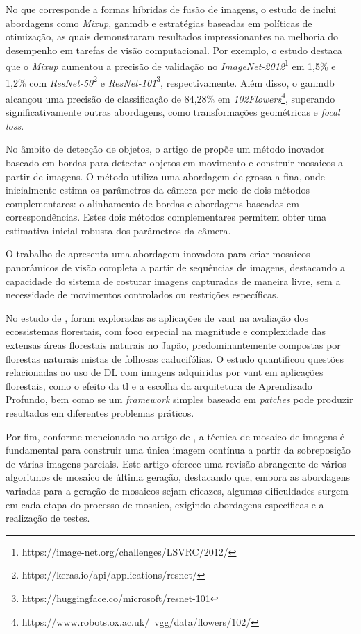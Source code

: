 No que corresponde a formas híbridas de fusão de imagens, o estudo de  inclui abordagens como \textit{Mixup}, \gls{ganmdb} e estratégias baseadas em políticas de otimização, as quais demonstraram resultados impressionantes na melhoria do desempenho em tarefas de visão computacional. Por exemplo, o estudo destaca que o \textit{Mixup} aumentou a precisão de validação no \textit{ImageNet-2012}\footnote{https://image-net.org/challenges/LSVRC/2012/} em 1,5\% e 1,2\% com \textit{ResNet-50}\footnote{https://keras.io/api/applications/resnet/} e \textit{ResNet-101}\footnote{https://huggingface.co/microsoft/resnet-101}, respectivamente. Além disso, o \gls{ganmdb} alcançou uma precisão de classificação de 84,28\% em \textit{102Flowers}\footnote{https://www.robots.ox.ac.uk/~vgg/data/flowers/102/}, superando significativamente outras abordagens, como transformações geométricas e \textit{focal loss}.

No âmbito de detecção de objetos, o artigo de  propõe um método inovador baseado em bordas para detectar objetos em movimento e construir mosaicos a partir de imagens. O método utiliza uma abordagem de grossa a fina, onde inicialmente estima os parâmetros da câmera por meio de dois métodos complementares: o alinhamento de bordas e abordagens baseadas em correspondências. Estes dois métodos complementares permitem obter uma estimativa inicial robusta dos parâmetros da câmera.

O trabalho de  apresenta uma abordagem inovadora para criar mosaicos panorâmicos de visão completa a partir de sequências de imagens, destacando a capacidade do sistema de costurar imagens capturadas de maneira livre, sem a necessidade de movimentos controlados ou restrições específicas.

No estudo de , foram exploradas as aplicações de \gls{vant} na avaliação dos ecossistemas florestais, com foco especial na magnitude e complexidade das extensas áreas florestais naturais no Japão, predominantemente compostas por florestas naturais mistas de folhosas caducifólias. O estudo quantificou questões relacionadas ao uso de DL com imagens adquiridas por \gls{vant} em aplicações florestais, como o efeito da \gls{tl} e a escolha da arquitetura de Aprendizado Profundo, bem como se um \textit{framework} simples baseado em \textit{patches} pode produzir resultados em diferentes problemas práticos.

Por fim, conforme mencionado no artigo de , a técnica de mosaico de imagens é fundamental para construir uma única imagem contínua a partir da sobreposição de várias imagens parciais. Este artigo oferece uma revisão abrangente de vários algoritmos de mosaico de última geração, destacando que, embora as abordagens variadas para a geração de mosaicos sejam eficazes, algumas dificuldades surgem em cada etapa do processo de mosaico, exigindo abordagens específicas e a realização de testes.


